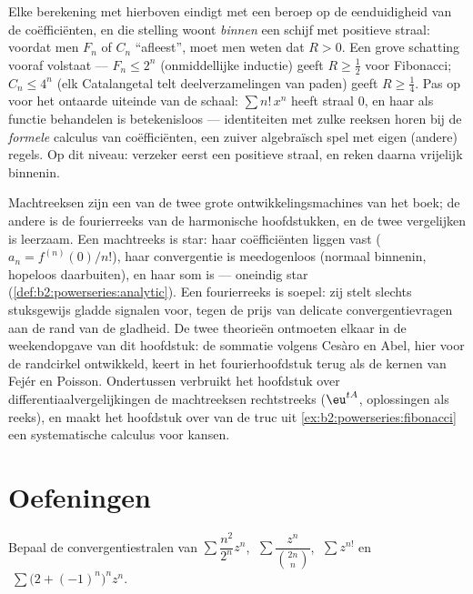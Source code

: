 \begin{remark}
Elke berekening met  hierboven eindigt met een
beroep op de eenduidigheid van de coëfficiënten, en die stelling
woont \emph{binnen} een schijf met positieve straal: voordat men
$F_n$ of $C_n$ ``afleest'', moet men weten dat $R > 0$. Een grove
schatting vooraf volstaat --- $F_n \leq 2^n$ (onmiddellijke
inductie) geeft $R \geq \frac12$ voor Fibonacci; $C_n \leq 4^n$
(elk Catalangetal telt deelverzamelingen van paden) geeft $R \geq
\frac14$. Pas op voor het ontaarde uiteinde van de schaal: $\sum
n!\,x^n$ heeft straal $0$, en haar als functie behandelen is
betekenisloos --- identiteiten met zulke reeksen horen bij de
\emph{formele} calculus van coëfficiënten, een zuiver algebraïsch
spel met eigen (andere) regels. Op dit niveau: verzeker eerst een
positieve straal, en reken daarna vrijelijk binnenin.
\end{remark}

\begin{remark}
Machtreeksen zijn een van de twee grote ontwikkelingsmachines van
het boek; de andere is de fourierreeks van de harmonische
hoofdstukken, en de twee vergelijken is leerzaam. Een machtreeks is
star: haar coëfficiënten liggen vast ($a_n = f^{(n)}(0)/n!$), haar
convergentie is meedogenloos (normaal binnenin, hopeloos
daarbuiten), en haar som is  --- oneindig star
(\cref{def:b2:powerseries:analytic}). Een fourierreeks is soepel:
zij stelt slechts stuksgewijs gladde signalen voor, tegen de prijs
van delicate convergentievragen aan de rand van de gladheid. De
twee theorieën ontmoeten elkaar in de weekendopgave van dit
hoofdstuk: de sommatie volgens Cesàro en Abel, hier voor de
randcirkel ontwikkeld, keert in het fourierhoofdstuk terug als de
kernen van Fejér en Poisson. Ondertussen verbruikt het hoofdstuk
over differentiaalvergelijkingen de machtreeksen rechtstreeks
($\eu^{tA}$, oplossingen als reeks), en maakt het hoofdstuk over
 van de truc uit
\cref{ex:b2:powerseries:fibonacci} een systematische calculus voor
kansen.
\end{remark}

\section{Oefeningen}

\begin{exercise}[$\star$]\label{exo:b2:powerseries:1}
Bepaal de convergentiestralen van $\sum \dfrac{n^2}{2^n}z^n$,
$\;\sum \dfrac{z^n}{\binom{2n}{n}}$, $\;\sum z^{n!}$ en $\;\sum
\bigl(2 + (-1)^n\bigr)^n z^n$.
\end{exercise}

